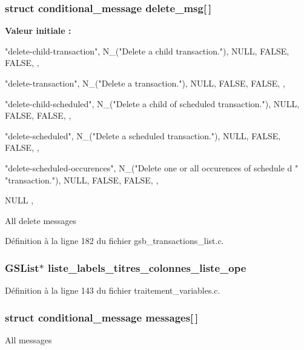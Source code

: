 \subsubsection[{delete\_\-msg}]{\setlength{\rightskip}{0pt plus 5cm}struct {\bf conditional\_\-message} {\bf delete\_\-msg}[$\,$]}\label{gsb__transactions__list_8c_a8be9044200783277533661fc770e77f5}
{\bfseries Valeur initiale :}
\begin{DoxyCode}

{
    { "delete-child-transaction", N_("Delete a child transaction."),
      NULL, 
      FALSE, FALSE, },

    { "delete-transaction",  N_("Delete a transaction."),
      NULL,
      FALSE, FALSE, },

    { "delete-child-scheduled", N_("Delete a child of scheduled transaction."),
      NULL,
      FALSE, FALSE, },

    { "delete-scheduled", N_("Delete a scheduled transaction."),
      NULL,
      FALSE, FALSE, },

    { "delete-scheduled-occurences", N_("Delete one or all occurences of schedule
      d "
      "transaction."),
      NULL,
      FALSE, FALSE, },


    { NULL },
}
\end{DoxyCode}
All delete messages 

Définition à la ligne 182 du fichier gsb\_\-transactions\_\-list.c.

\subsubsection[{liste\_\-labels\_\-titres\_\-colonnes\_\-liste\_\-ope}]{\setlength{\rightskip}{0pt plus 5cm}GSList$\ast$ {\bf liste\_\-labels\_\-titres\_\-colonnes\_\-liste\_\-ope}}\label{gsb__transactions__list_8c_a53693b9d5a4ba330fa5650e09ef0519f}


Définition à la ligne 143 du fichier traitement\_\-variables.c.

\subsubsection[{messages}]{\setlength{\rightskip}{0pt plus 5cm}struct {\bf conditional\_\-message} {\bf messages}[$\,$]}\label{gsb__transactions__list_8c_a430b9f94c0af809780196ca7d7040fde}
All messages 


